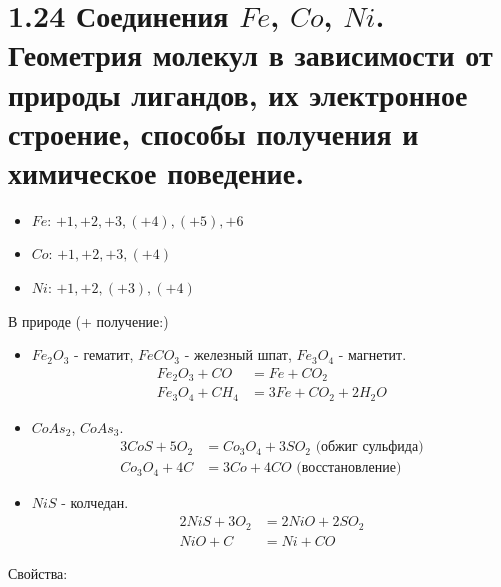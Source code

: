 \section*{1.24 Соединения $Fe$, $Co$, $Ni$. Геометрия молекул в зависимости от природы лигандов, их электронное строение, способы получения и химическое поведение.}
\begin{itemize}
	\item $Fe$: $+1, +2, +3, (+4), (+5), +6$	
	\item $Co$: $+1, +2, +3, (+4)$
	\item $Ni$: $+1, +2, (+3), (+4)$
\end{itemize}
В природе (+ получение:)
\begin{itemize}
	\item $Fe_2O_3$ - гематит, $FeCO_3$ - железный шпат, $Fe_3O_4$ - магнетит.
	\begin{align*}
	Fe_2O_3 + CO &= Fe + CO_2 \\
	Fe_3O_4 + CH_4 &= 3 Fe + CO_2 + 2 H_2O	
	\end{align*}
	\item $CoAs_2$, $CoAs_3$.
	\begin{align*}
	3 CoS + 5O_2 &= Co_3O_4 + 3SO_2 \text{ (обжиг сульфида)} \\
	Co_3O_4 + 4 C &= 3 Co + 4 CO \text{ (восстановление)}
	\end{align*}	
	\item $NiS$ - колчедан.
	\begin{align*}
	2 NiS + 3O_2 &= 2NiO + 2SO_2 \\
	NiO +  C &= Ni + CO 
	\end{align*}
\end{itemize}
Свойства:
